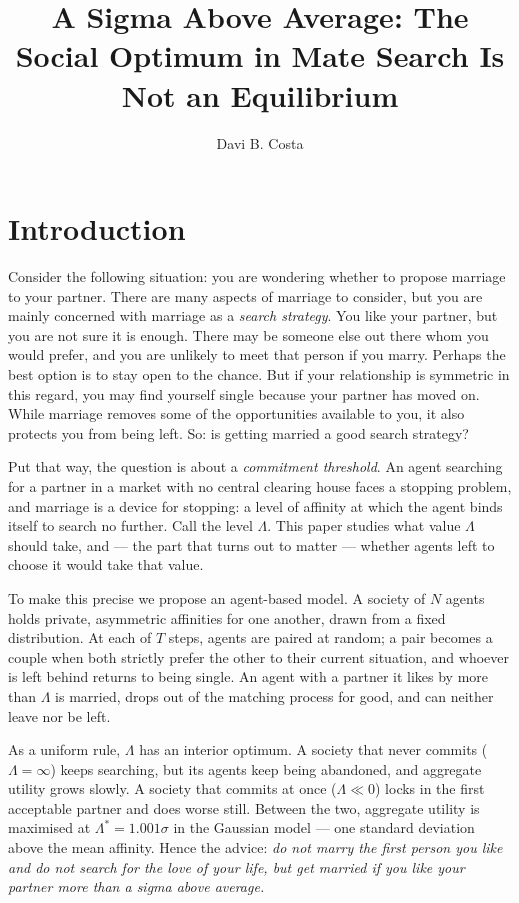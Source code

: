 \documentclass[sigconf,anonymous]{aamas}
\title[A Sigma Above Average]{A Sigma Above Average: The Social Optimum in
Mate Search Is Not an Equilibrium}
\author{Davi B. Costa}
\affiliation{
  \institution{University of S\~{a}o Paulo}
  \city{S\~{a}o Paulo}
  \country{Brazil}}
\newcommand{\Lopt}{\Lambda^\ast}
\begin{document}
\pagestyle{fancy}
\fancyhead{}

\maketitle


\section{Introduction}

Consider the following situation: you are wondering whether to propose marriage
to your partner. There are many aspects of marriage to consider, but you are
mainly concerned with marriage as a \emph{search strategy}. You like your
partner, but you are not sure it is enough. There may be someone else out there
whom you would prefer, and you are unlikely to meet that person if you marry.
Perhaps the best option is to stay open to the chance. But if your relationship
is symmetric in this regard, you may find yourself single because your partner
has moved on. While marriage removes some of the opportunities available to you,
it also protects you from being left. So: is getting married a good search
strategy?

Put that way, the question is about a \emph{commitment threshold}. An agent
searching for a partner in a market with no central clearing house faces a
stopping problem, and marriage is a device for stopping: a level of affinity at
which the agent binds itself to search no further. Call the level $\Lambda$.
This paper studies what value $\Lambda$ should take, and --- the part that turns
out to matter --- whether agents left to choose it would take that value.

To make this precise we propose an agent-based model. A society of $N$ agents
holds private, asymmetric affinities for one another, drawn from a fixed
distribution. At each of $T$ steps, agents are paired at random; a pair becomes
a couple when both strictly prefer the other to their current situation, and
whoever is left behind returns to being single. An agent with a partner it likes
by more than $\Lambda$ is married, drops out of the matching process for good,
and can neither leave nor be left.

As a uniform rule, $\Lambda$ has an interior optimum. A society that never
commits ($\Lambda = \infty$) keeps searching, but its agents keep being
abandoned, and aggregate utility grows slowly. A society that commits at once
($\Lambda \ll 0$) locks in the first acceptable partner and does worse still.
Between the two, aggregate utility is maximised at
$\Lopt = 1.001\sigma$ in the Gaussian model --- one standard deviation above the
mean affinity. Hence the advice: \emph{do not marry the first person you like
and do not search for the love of your life, but get married if you like your
partner more than a sigma above average.}
\end{document}
